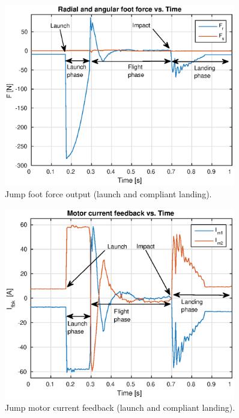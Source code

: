 \begin{figure}
\centering
\includegraphics[width=0.9\textwidth]{images/experiments/jump/jump-foot-force.eps} 
\caption{Jump foot force output (launch and compliant landing).}
\label{fig:Jump foot force output}
\end{figure}

\begin{figure}
\centering
\includegraphics[width=0.9\textwidth]{images/experiments/jump/jump-current-feedback.eps} 
\caption{Jump motor current feedback (launch and compliant landing).}
\label{fig:jump-motor-current-feedback}
\end{figure}

